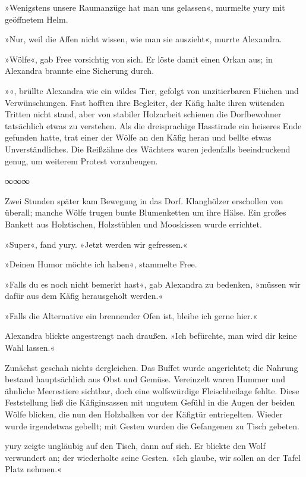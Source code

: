 »Wenigstens unsere Raumanzüge hat man uns gelassen«, murmelte yury mit geöffnetem Helm.

»Nur, weil die Affen nicht wissen, wie man sie auszieht«, murrte Alexandra.

»Wölfe«, gab Free vorsichtig von sich. Er löste damit einen Orkan aus; in Alexandra brannte eine Sicherung durch.

»«, brüllte Alexandra wie ein wildes Tier, gefolgt von unzitierbaren Flüchen und Verwünschungen. Fast hofften ihre Begleiter, der Käfig halte ihren wütenden Tritten nicht stand, aber von stabiler Holzarbeit schienen die Dorfbewohner tatsächlich etwas zu verstehen. Als die dreisprachige Hasstirade ein heiseres Ende gefunden hatte, trat einer der Wölfe an den Käfig heran und bellte etwas Unverständliches. Die Reißzähne des Wächters waren jedenfalls beeindruckend genug, um weiterem Protest vorzubeugen.

\begin{center}
∞∞∞
\end{center}

Zwei Stunden später kam Bewegung in das Dorf. Klanghölzer erschollen von überall; manche Wölfe trugen bunte Blumenketten um ihre Hälse. Ein großes Bankett aus Holztischen, Holzstühlen und Mooskissen wurde errichtet.

»Super«, fand yury. »Jetzt werden wir gefressen.«

»Deinen Humor möchte ich haben«, stammelte Free.

»Falls du es noch nicht bemerkt hast«, gab Alexandra zu bedenken, »müssen wir dafür aus dem Käfig herausgeholt werden.«

»Falls die Alternative ein brennender Ofen ist, bleibe ich gerne hier.«

Alexandra blickte angestrengt nach draußen. »Ich befürchte, man wird dir keine Wahl lassen.«

Zunächst geschah nichts dergleichen. Das Buffet wurde angerichtet; die Nahrung bestand hauptsächlich aus Obst und Gemüse. Vereinzelt waren Hummer und ähnliche Meerestiere sichtbar, doch eine wolfswürdige Fleischbeilage fehlte. Diese Feststellung ließ die Käfiginsassen mit ungutem Gefühl in die Augen der beiden Wölfe blicken, die nun den Holzbalken vor der Käfigtür entriegelten. Wieder wurde irgendetwas gebellt; mit Gesten wurden die Gefangenen zu Tisch gebeten.

yury zeigte ungläubig auf den Tisch, dann auf sich. Er blickte den Wolf verwundert an; der wiederholte seine Gesten. »Ich glaube, wir sollen an der Tafel Platz nehmen.«

